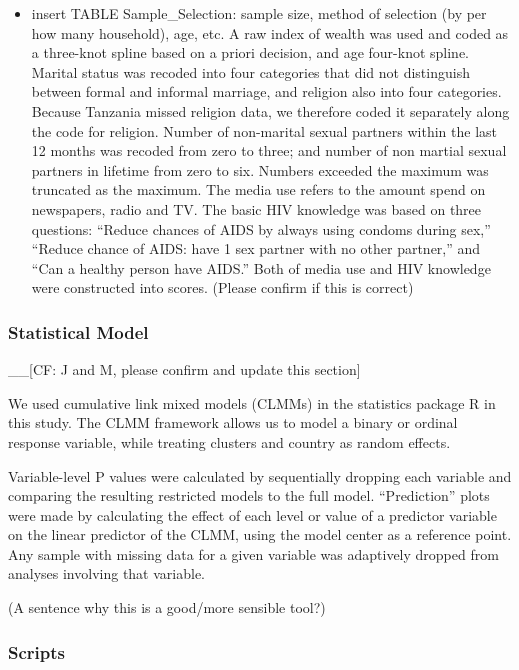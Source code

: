 \documentclass[12pt,]{article}
\providecommand{\tightlist}{%
  \setlength{\itemsep}{0pt}\setlength{\parskip}{0pt}}
\begin{document}
\begin{itemize}
\tightlist
\item
  insert TABLE Sample\_Selection: sample size, method of selection (by
  per how many household), age, etc. A raw index of wealth was used and
  coded as a three-knot spline based on a priori decision, and age
  four-knot spline. Marital status was recoded into four categories that
  did not distinguish between formal and informal marriage, and religion
  also into four categories. Because Tanzania missed religion data, we
  therefore coded it separately along the code for religion. Number of
  non-marital sexual partners within the last 12 months was recoded from
  zero to three; and number of non martial sexual partners in lifetime
  from zero to six. Numbers exceeded the maximum was truncated as the
  maximum. The media use refers to the amount spend on newspapers, radio
  and TV. The basic HIV knowledge was based on three questions: ``Reduce
  chances of AIDS by always using condoms during sex,'' ``Reduce chance
  of AIDS: have 1 sex partner with no other partner,'' and ``Can a
  healthy person have AIDS.'' Both of media use and HIV knowledge were
  constructed into scores. (Please confirm if this is correct)
\end{itemize}

\subsubsection{Statistical Model}\label{statistical-model}

\_\_{[}CF: J and M, please confirm and update this section{]}

We used cumulative link mixed models (CLMMs) in the statistics package R
\autocite[Rpackage\_ordinal]{Rstats} in this study. The CLMM framework
allows us to model a binary or ordinal response variable, while treating
clusters and country as random effects.

Variable-level P values were calculated by sequentially dropping each
variable and comparing the resulting restricted models to the full
model. ``Prediction'' plots were made by calculating the effect of each
level or value of a predictor variable on the linear predictor of the
CLMM, using the model center as a reference point. Any sample with
missing data for a given variable was adaptively dropped from analyses
involving that variable.

(A sentence why this is a good/more sensible tool?)

\subsubsection{Scripts}\label{scripts}
\end{document}
